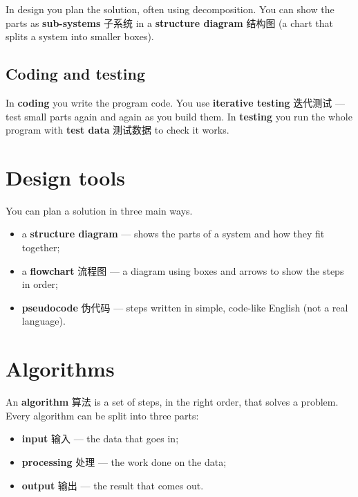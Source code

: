\documentclass[11pt]{article}
\begin{document}
In design you plan the solution, often using decomposition. You can show the parts as \textbf{sub-systems} 子系统 in a \textbf{structure diagram} 结构图 (a chart that splits a system into smaller boxes).

\subsection*{Coding and testing}

In \textbf{coding} you write the program code. You use \textbf{iterative testing} 迭代测试 — test small parts again and again as you build them. In \textbf{testing} you run the whole program with \textbf{test data} 测试数据 to check it works.

\section*{Design tools}

You can plan a solution in three main ways.

\begin{itemize}
\item a \textbf{structure diagram} — shows the parts of a system and how they fit together;

\item a \textbf{flowchart} 流程图 — a diagram using boxes and arrows to show the steps in order;

\item \textbf{pseudocode} 伪代码 — steps written in simple, code-like English (not a real language).

\end{itemize}

\section*{Algorithms}

An \textbf{algorithm} 算法 is a set of steps, in the right order, that solves a problem. Every algorithm can be split into three parts:

\begin{itemize}
\item \textbf{input} 输入 — the data that goes in;

\item \textbf{processing} 处理 — the work done on the data;

\item \textbf{output} 输出 — the result that comes out.

\end{itemize}
\end{document}

